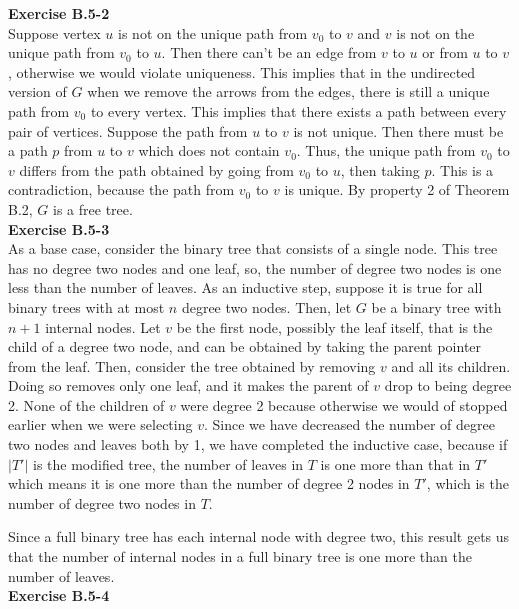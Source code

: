 \documentclass{article}
\begin{document}
\noindent\textbf{Exercise B.5-2}\\

Suppose vertex $u$ is not on the unique path from $v_0$ to $v$ and $v$ is not on the unique path from $v_0$ to $u$.  Then there can't be an edge from $v$ to $u$ or from $u$ to $v$, otherwise we would violate uniqueness.  This implies that in the undirected version of $G$ when we remove the arrows from the edges, there is still a unique path from $v_0$ to every vertex.  This implies that there exists a path between every pair of vertices.  Suppose the path from $u$ to $v$ is not unique. Then there must be a path $p$ from $u$ to $v$ which does not contain $v_0$.  Thus, the unique path from $v_0$ to $v$ differs from the path obtained by going from $v_0$ to $u$, then taking $p$.  This is a contradiction, because the path from $v_0$ to $v$ is unique.  By property 2 of Theorem B.2, $G$ is a free tree.\\


\noindent\textbf{Exercise B.5-3}\\
As a base case, consider the binary tree that consists of a single node. This tree has no degree two nodes and one leaf, so, the number of degree two nodes is one less than the number of leaves. As an inductive step, suppose it is true for all binary trees with at most $n$ degree two nodes. Then, let $G$ be a binary tree with $n+1$ internal nodes. Let $v$ be the first node, possibly the leaf itself, that is the child of a degree two node, and can be obtained by taking the parent pointer from the leaf. Then, consider the tree obtained by removing $v$ and all its children. Doing so removes only one leaf, and it makes the parent of $v$ drop to being degree 2. None of the children of $v$ were degree 2 because otherwise we would of stopped earlier when we were selecting $v$. Since we have decreased the number of degree two nodes and leaves both by 1, we have completed the inductive case, because if $|T'|$ is the modified tree, the number of leaves in $T$ is one more than that in $T'$ which means it is one more than the number of degree 2 nodes in $T'$, which is the number of degree two nodes in $T$.

Since a full binary tree has each internal node with degree two, this result gets us that the number of internal nodes in a full binary tree is one more than the number of leaves.\\

\noindent\textbf{Exercise B.5-4}\\
\end{document}
